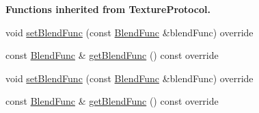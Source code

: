 \begin{Indent}\textbf{ Functions inherited from Texture\+Protocol.}\par
\begin{DoxyCompactItemize}
\item 
void \hyperlink{classSprite_af78e53072fccdf0491c02098c55b282f}{set\+Blend\+Func} (const \hyperlink{structBlendFunc}{Blend\+Func} \&blend\+Func) override
\item 
const \hyperlink{structBlendFunc}{Blend\+Func} \& \hyperlink{classSprite_a7e9792ae4ddc7fef178386e5b8602361}{get\+Blend\+Func} () const override
\item 
void \hyperlink{classSprite_af78e53072fccdf0491c02098c55b282f}{set\+Blend\+Func} (const \hyperlink{structBlendFunc}{Blend\+Func} \&blend\+Func) override
\item 
const \hyperlink{structBlendFunc}{Blend\+Func} \& \hyperlink{classSprite_a7e9792ae4ddc7fef178386e5b8602361}{get\+Blend\+Func} () const override
\end{DoxyCompactItemize}
\end{Indent}
